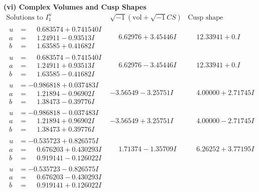 \documentclass[1p]{elsarticle_modified}
\theoremstyle{definition}
\newcommand{\I}{\sqrt{-1}}
\begin{document}
\newpage\flushleft \textbf{(vi) Complex Volumes and Cusp Shapes}
$$\begin{array}{c|c|c}  
\text{Solutions to }I^u_{1}& \I (\text{vol} + \sqrt{-1}CS) & \text{Cusp shape}\\
 \hline 
\begin{aligned}
u &= \phantom{-}0.683574 + 0.741540 I \\
a &= \phantom{-}1.24911 - 0.93513 I \\
b &= \phantom{-}1.63585 + 0.41682 I\end{aligned}
 & \phantom{-}6.62976 + 3.45446 I & \phantom{-}12.33941 + 0. I\phantom{ +0.000000I} \\ \hline\begin{aligned}
u &= \phantom{-}0.683574 - 0.741540 I \\
a &= \phantom{-}1.24911 + 0.93513 I \\
b &= \phantom{-}1.63585 - 0.41682 I\end{aligned}
 & \phantom{-}6.62976 - 3.45446 I & \phantom{-}12.33941 + 0. I\phantom{ +0.000000I} \\ \hline\begin{aligned}
u &= -0.986818 + 0.037483 I \\
a &= \phantom{-}1.21894 - 0.96902 I \\
b &= \phantom{-}1.38473 - 0.39776 I\end{aligned}
 & -3.56549 - 3.25751 I & \phantom{-}4.00000 + 2.71745 I \\ \hline\begin{aligned}
u &= -0.986818 - 0.037483 I \\
a &= \phantom{-}1.21894 + 0.96902 I \\
b &= \phantom{-}1.38473 + 0.39776 I\end{aligned}
 & -3.56549 + 3.25751 I & \phantom{-}4.00000 - 2.71745 I \\ \hline\begin{aligned}
u &= -0.535723 + 0.826575 I \\
a &= \phantom{-}0.676203 + 0.430293 I \\
b &= \phantom{-}0.919141 - 0.126022 I\end{aligned}
 & \phantom{-}1.71374 - 1.35709 I & \phantom{-}6.26252 + 3.77195 I \\ \hline\begin{aligned}
u &= -0.535723 - 0.826575 I \\
a &= \phantom{-}0.676203 - 0.430293 I \\
b &= \phantom{-}0.919141 + 0.126022 I\end{aligned}

\end{array}$$
\end{document}
